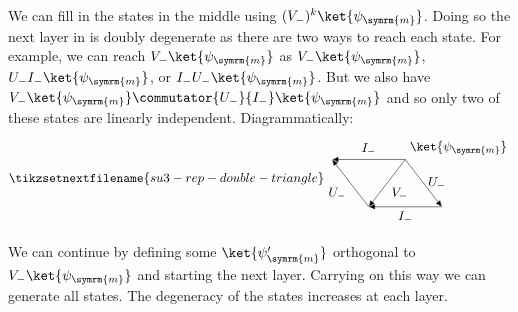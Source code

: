 \documentclass[fleqn]{NotesClass}
\begin{document}
    We can fill in the states in the middle using \((V_-)^k\ket{\psi_{\symrm{m}}}\).
    Doing so the next layer in is doubly degenerate as there are two ways to reach each state.
    For example, we can reach \(V_-\ket{\psi_{\symrm{m}}}\) as \(V_-\ket{\psi_{\symrm{m}}}\), \(U_- I_- \ket{\psi_{\symrm{m}}}\), or \(I_- U_- \ket{\psi_{\symrm{m}}}\).
    But we also have \(V_-\ket{\psi_{\symrm{m}}} \commutator{U_-}{I_-}\ket{\psi_{\symrm{m}}}\) and so only two of these states are linearly independent.
    Diagrammatically:
    \begin{equation}
        \tikzsetnextfilename{su3-rep-double-triangle}
        \begin{tikzpicture}[
            >={Latex[width=1.5mm]},
            baseline = (current bounding box)
            ]
            \draw[->] (0, 0) node [above right] {\(\ket{\psi_{\symrm{m}}}\)} -- (-2, 0) node [midway, above] {\(I_-\)};
            \draw[->] (0, 0) -- (-1, -1.3) node [midway, below right] {\(V_-\)};
            \draw[->] (-1, -1.3) -- (-2, 0) node [midway, below left] {\(U_-\)};
            \draw[->] (1, -1.3) -- (-1, -1.3) node [midway, below] {\(I_-\)};
            \draw[->] (0, 0) -- (1, -1.3) node [midway, right] {\(U_-\)};
        \end{tikzpicture}
    \end{equation}
    
    We can continue by defining some \(\ket{\psi_{\symrm{m}}'}\) orthogonal to \(V_-\ket{\psi_{\symrm{m}}}\) and starting the next layer.
    Carrying on this way we can generate all states.
    The degeneracy of the states increases at each layer.
    
\end{document}
